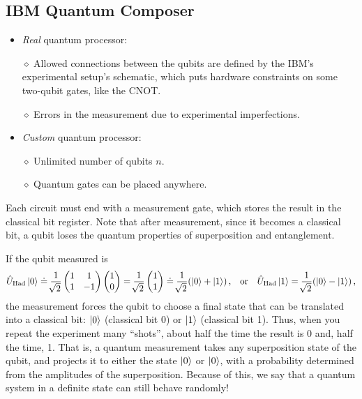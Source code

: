 \documentclass[11pt]{article}
\numberwithin{equation}{section} %
\numberwithin{figure}{section} %
\begin{document}
\begin{appendices}
\section{IBM Quantum Composer} \label{IBM Quantum Composer}
\begin{itemize}
\item \emph{Real} quantum processor:

$\diamond$ Allowed connections between the qubits are defined by the IBM's experimental setup's schematic, which puts hardware constraints on some two-qubit gates, like the CNOT.

$\diamond$ Errors in the measurement due to experimental imperfections.

\item \emph{Custom} quantum processor:

$\diamond$ Unlimited number of qubits $n$.

$\diamond$ Quantum gates can be placed anywhere.
\end{itemize}
Each circuit must end with a measurement gate, which stores the result in the classical bit register. Note that after measurement, since it becomes a classical bit, a qubit loses the quantum properties of superposition and entanglement.

If the qubit measured is
\begin{equation}
\hat{U}_{\textrm{Had}}\ket{0}\doteq\frac{1}{\sqrt[]{2}}\begin{pmatrix}1&1\\1&-1\end{pmatrix}\begin{pmatrix}1\\0
\end{pmatrix}=\frac{1}{\sqrt[]{2}}\begin{pmatrix}1\\1
\end{pmatrix}\doteq\frac{1}{\sqrt[]{2}}(\ket{0}+\ket{1})\,\textrm{,}\quad\textrm{or}\quad\hat{U}_{\textrm{Had}}\ket{1}=\frac{1}{\sqrt[]{2}}(\ket{0}-\ket{1})\,\textrm{,}
\end{equation}
the measurement forces the qubit to choose a final state that can be translated into a classical bit: $\ket{0}$ (classical bit 0) or $\ket{1}$ (classical bit 1). Thus, when you repeat the experiment many “shots”, about half the time the result is 0 and, half the time, 1. That is, a quantum measurement takes any superposition state of the qubit, and projects it to either the state $\ket{0}$ or $\ket{0}$, with a probability determined from the amplitudes of the superposition. Because of this, we say that a quantum system in a definite state can still behave randomly!



\end{appendices}
\end{document}
